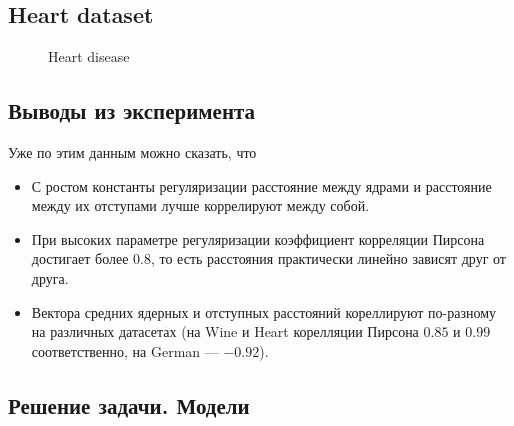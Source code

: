 \documentclass[12pt,twoside]{article}
\theoremstyle{plain}
\theoremstyle{remark}
\theoremstyle{definition}
\begin{document}



\newpage

\subsection{Heart dataset}

\begin{figure}[H]
      \caption{Heart disease}
\end{figure}



\subsection{Выводы из эксперимента}

Уже по этим данным можно сказать, что

\begin{itemize}
  \item С ростом константы регуляризации расстояние между ядрами и расстояние между	
  их отступами лучше коррелируют между собой.
  \item При высоких параметре регуляризации коэффициент корреляции Пирсона 
  достигает более $0.8$, то есть расстояния практически линейно зависят друг от друга.
  \item Вектора средних ядерных и отступных расстояний кореллируют по-разному на различных датасетах (на Wine и Heart корелляции Пирсона $0.85$ и $0.99$ соответственно, на German --- $-0.92$).
\end{itemize} 

\newpage

\subsection{Решение задачи. Модели}
\end{document}
